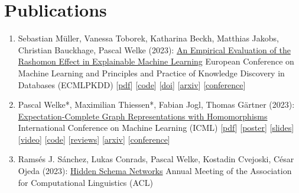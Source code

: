 \documentclass{scrartcl}
\begin{document}
\section{Publications}
\begin{enumerate}
\conti
\item
\label{mueller2023ecml}
Sebastian Müller, Vanessa Toborek, Katharina Beckh, Matthias Jakobs, Christian Bauckhage, Pascal Welke (2023):\newline
\href{https://dx.doi.org/10.1007/978-3-031-43418-1_28}{An Empirical Evaluation of the Rashomon Effect in Explainable Machine Learning}\newline
European Conference on Machine Learning and Principles and Practice of Knowledge Discovery in Databases (ECMLPKDD)\newline
{\footnotesize
[\href{https://pwelke.github.io/publications/mueller2023rashomon.pdf}{pdf}]
[\href{https://github.com/lamarr-xai-group/RashomonEffect}{code}]
[\href{https://dx.doi.org/10.1007/978-3-031-43418-1_28}{doi}]
[\href{https://arxiv.org/abs/2306.15786}{arxiv}]
[\href{https://2023.ecmlpkdd}{conference}]
}
\item
\label{welke2023expectation}
Pascal Welke*, Maximilian Thiessen*, Fabian Jogl, Thomas Gärtner (2023):\newline
\href{https://proceedings.mlr.press/v202/welke23a.html}{Expectation-Complete Graph Representations with Homomorphisms}\newline
International Conference on Machine Learning (ICML)\newline
{\footnotesize
[\href{https://pwelke.github.io/publications/welkethiessen2023expectationcomplete.pdf}{pdf}]
[\href{https://pwelke.github.io/publications/expectation_complete_poster_ICML.pdf}{poster}]
[\href{https://pwelke.github.io/publications/expectation_complete_slides_ICML.pdf}{slides}]
[\href{https://slideslive.com/39003466/expectationcomplete-graph-representations-with-homomorphisms}{video}]
[\href{https://github.com/pwelke/homcount}{code}]
[\href{https://openreview.net/forum?id=ppgRPC14uI}{reviews}]
[\href{https://arxiv.org/abs/2306.05838}{arxiv}]
[\href{https://icml.cc/2023}{conference}]
}
\item
\label{sanchez2023hiddenschema}
Ramsés J. Sánchez, Lukas Conrads, Pascal Welke, Kostadin Cvejoski, César Ojeda (2023):\newline
\href{https://dx.doi.org/10.18653/v1/2023.acl-long.263}{Hidden Schema Networks}\newline
Annual Meeting of the Association for Computational Linguistics (ACL)\newline

\end{enumerate}
\end{document}

